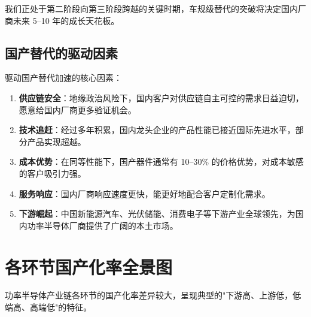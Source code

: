 我们正处于第二阶段向第三阶段跨越的关键时期，车规级替代的突破将决定国内厂商未来 5–10 年的成长天花板。

\subsection{国产替代的驱动因素}

驱动国产替代加速的核心因素：

\begin{enumerate}[leftmargin=2em]
\item \textbf{供应链安全}：地缘政治风险下，国内客户对供应链自主可控的需求日益迫切，愿意给国内厂商更多验证机会。
\item \textbf{技术追赶}：经过多年积累，国内龙头企业的产品性能已接近国际先进水平，部分产品实现超越。
\item \textbf{成本优势}：在同等性能下，国产器件通常有 10–30\% 的价格优势，对成本敏感的客户吸引力强。
\item \textbf{服务响应}：国内厂商响应速度更快，能更好地配合客户定制化需求。
\item \textbf{下游崛起}：中国新能源汽车、光伏储能、消费电子等下游产业全球领先，为国内功率半导体厂商提供了广阔的本土市场。
\end{enumerate}

\section{各环节国产化率全景图}

功率半导体产业链各环节的国产化率差异较大，呈现典型的"下游高、上游低，低端高、高端低"的特征。

